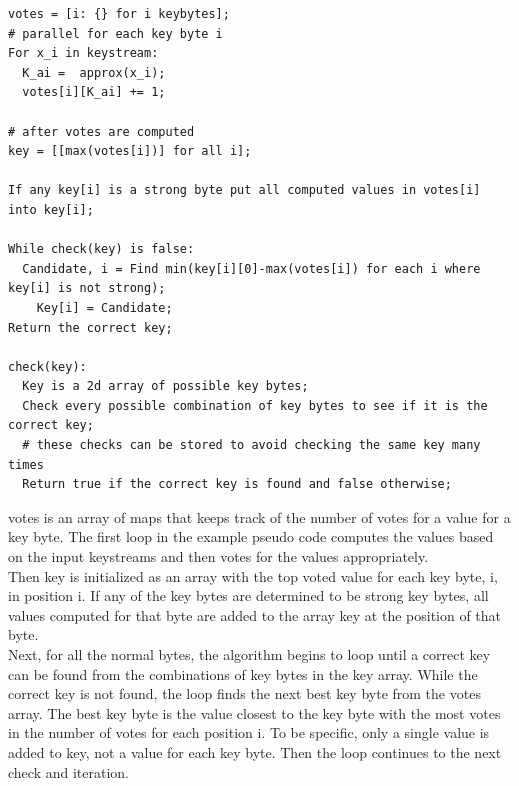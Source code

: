 \documentclass[10pt, titlepage]{article}
\begin{document}
\begin{verbatim}
votes = [i: {} for i keybytes];
# parallel for each key byte i
For x_i in keystream:
  K_ai =  approx(x_i);
  votes[i][K_ai] += 1;

# after votes are computed
key = [[max(votes[i])] for all i];

If any key[i] is a strong byte put all computed values in votes[i] into key[i];

While check(key) is false:
  Candidate, i = Find min(key[i][0]-max(votes[i]) for each i where key[i] is not strong);
    Key[i] = Candidate;
Return the correct key;

check(key):
  Key is a 2d array of possible key bytes;
  Check every possible combination of key bytes to see if it is the correct key;
  # these checks can be stored to avoid checking the same key many times
  Return true if the correct key is found and false otherwise;
\end{verbatim}

votes is an array of maps that keeps track of the number of votes for a value for a key byte. The first loop in the example pseudo code computes the values based on the input keystreams and then votes for the values appropriately. \\

Then key is initialized as an array with the top voted value for each key byte, i, in position i. If any of the key bytes are determined to be strong key bytes, all values computed for that byte are added to the array key at the position of that byte. \\

Next, for all the normal bytes, the algorithm begins to loop until a correct key can be found from the combinations of key bytes in the key array. While the correct key is not found, the loop finds the next best key byte from the votes array. The best key byte is the value closest to the key byte with the most votes in the number of votes for each position i. To be specific, only a single value is added to key, not a value for each key byte. Then the loop continues to the next check and iteration.
\end{document}
